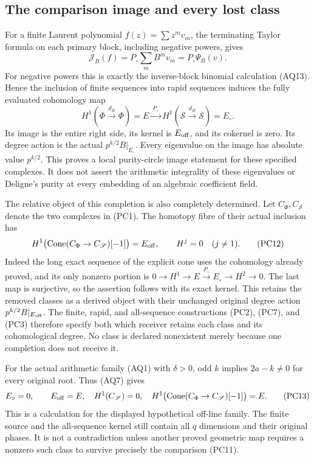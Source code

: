 \documentclass[11pt,a4paper]{article}
\theoremstyle{definition}\newtheorem{definition}[theorem]{Definition}
\begin{document}
\subsection{The comparison image and every lost class}
For a finite Laurent polynomial $f(z)=\sum z^mv_m$, the terminating
Taylor formula on each primary block, including negative powers,
gives
\[
 \mathcal J_B(f)=P_\circ\sum_mB^mv_m=P_\circ\Psi_B(v).
 \tag{PC10}
\]
For negative powers this is exactly the inverse-block binomial
calculation (AQ13). Hence the inclusion of finite sequences into
rapid sequences induces the fully evaluated cohomology map
\[
 \boxed{H^1(\Phi\xrightarrow{d_B}\Phi)=E
       \xrightarrow{\ P_\circ\ }
       H^1(\mathscr S\xrightarrow{d_B}\mathscr S)=E_\circ.}
 \tag{PC11}
\]
Its image is the entire right side, its kernel is $E_{\rm off}$, and
its cokernel is zero. Its degree action is the actual
$p^{k/2}B|_{E_\circ}$. Every eigenvalue on the image has absolute
value $p^{k/2}$. This proves a local purity-circle image statement for
these specified complexes. It does not assert the arithmetic
integrality of these eigenvalues or Deligne's purity at every
embedding of an algebraic coefficient field.

The relative object of this completion is also completely determined.
Let $C_\Phi,C_{\mathscr S}$ denote the two complexes in (PC1).
The homotopy fibre of their actual inclusion has
\[
 H^1\bigl(\operatorname{Cone}(C_\Phi\to C_{\mathscr S})[-1]\bigr)
       =E_{\rm off},\qquad H^j=0\quad(j\ne1).
 \tag{PC12}
\]
Indeed the long exact sequence of the explicit cone uses the
cohomology already proved, and its only nonzero portion is
$0\to H^1\to E\xrightarrow{P_\circ}E_\circ\to H^2\to0$.
The last map is surjective, so the assertion follows with its exact
kernel. This retains the removed classes as a derived object with
their unchanged original degree action $p^{k/2}B|_{E_{\rm off}}$.
The finite, rapid, and all-sequence constructions (PC2), (PC7), and
(PC3) therefore specify both which receiver retains each class and
its cohomological degree. No class is declared nonexistent merely
because one completion does not receive it.

For the actual arithmetic family (AQ1) with $\delta>0$, odd $k$
implies $2a-k\ne0$ for every original root. Thus (AQ7) gives
\[
 E_\circ=0,\qquad E_{\rm off}=E,
 \quad H^1(C_{\mathscr S})=0,
 \quad H^1\bigl(\operatorname{Cone}(C_\Phi\to C_{\mathscr S})[-1]\bigr)=E.
 \tag{PC13}
\]
This is a calculation for the displayed hypothetical off-line family.
The finite source and the all-sequence kernel still contain all $q$
dimensions and their original phases. It is not a contradiction
unless another proved geometric map requires a nonzero such class to
survive precisely the comparison (PC11).
\end{document}
